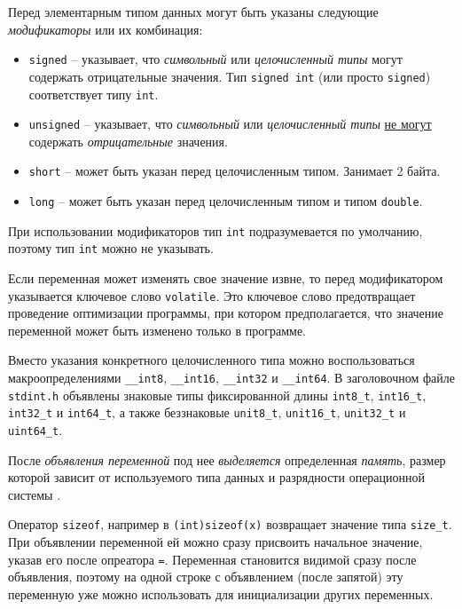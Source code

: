 \documentclass[%
	11pt,
	a4paper,
	utf8,
		]{article}
\begin{document}
Перед элементарным типом данных могут быть указаны следующие \emph{модификаторы} или их комбинация:
\begin{itemize}
	\item \verb*|signed| -- указывает, что \emph{символьный} или \emph{целочисленный типы} могут содержать отрицательные значения. Тип \verb*|signed int| (или просто \verb|signed|) соответствует типу \verb*|int|.
	
	\item \verb|unsigned| -- указывает, что \emph{символьный} или \emph{целочисленный типы} \underline{не могут} содержать \emph{отрицательные} значения.
	
	\item \verb|short| -- может быть указан перед целочисленным типом. Занимает 2 байта.
	
	\item \verb*|long| -- может быть указан перед целочисленным типом и типом \verb|double|.
\end{itemize}

При использовании модификаторов тип \verb|int| подразумевается по умолчанию, поэтому тип \verb*|int| можно не указывать.

Если переменная может изменять свое значение извне, то перед модификатором указывается ключевое слово \verb|volatile|. Это ключевое слово предотвращает проведение оптимизации программы, при котором предполагается, что значение переменной может быть изменено только в программе.

Вместо указания конкретного целочисленного типа можно воспользоваться макроопределениями \verb*|__int8|, \verb|__int16|, \verb*|__int32| и \verb|__int64|. В заголовочном файле \verb*|stdint.h| объявлены знаковые типы фиксированной длины \verb|int8_t|, \verb*|int16_t|, \verb|int32_t| и \verb*|int64_t|, а также беззнаковые \verb|unit8_t|, \verb*|unit16_t|, \verb|unit32_t| и \verb*|uint64_t|.

После \emph{объявления переменной} под нее \emph{выделяется} определенная \emph{память}, размер которой зависит от используемого типа данных и разрядности операционной системы \cite[]{prokhorenok-prog-c:2020}. 

Оператор \verb*|sizeof|, например в \verb|(int)sizeof(x)| возвращает значение типа \verb|size_t|. При объявлении переменной ей можно сразу присвоить начальное значение, указав его после опреатора \verb*|=|. Переменная становится видимой сразу после объявления, поэтому на одной строке с объявлением (после запятой) эту переменную уже можно использовать для инициализации других переменных.
\end{document}

